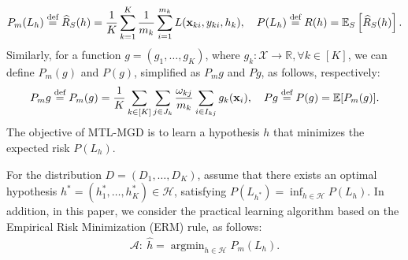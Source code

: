 \documentclass{article}
\def\sR{\mathbb{R}}
\def\vx{{\mathbf{x}}}
\def\mX{{\mathbf{X}}}
\def\eE{\mathbb{E}}
\def\tS{\tilde{S}}
\def\ty{\tilde{y}}
\def\defeq{\overset{\textup{def}}{=}}
\DeclareMathOperator*{\argmin}{argmin}
\begin{document}
    \begin{align} \label{def: initial risk}
        P_m (L_h) \defeq \widehat{R}_{S}(h) = \frac{1}{K} \sum_{k=1}^K \frac{1}{m_k} \sum_{i=1}^{m_k} L(\vx_{ki}, y_{ki}, h_k) , \quad  P (L_h) \defeq R(h) = \eE_{S} \left[ \widehat{R}_{S}(h) \right] .
    \end{align}
Similarly, for a function $g = (g_1,\dots, g_K)$, where $g_k: \mathcal{X} \rightarrow \sR, \forall k \in [K]$, 
we can define $P_m (g)$ and $P (g)$, simplified as $P_m g$ and $P g$, as follows, respectively:
\begin{align} \label{def: pmg} 
    P_m g \defeq P_m (g)  = \frac{1}{K} \sum_{k \in [K]} \sum_{j \in J_k} \frac{\omega_{kj}}{m_k} \sum_{i \in I_{kj}} g_k(\vx_i), \quad 
    P g \defeq P (g)  = \eE [P_m (g)]. 
\end{align}
The objective of MTL-MGD is to learn a hypothesis $h$ that minimizes the expected risk $P (L_h)$. 

For the distribution $D = (D_1, \dots, D_K)$, assume that there exists an optimal hypothesis $h^*=(h_1^*,\dots,h_K^*) \in \mathcal{H}$, satisfying $P (L_{h^*}) = \inf_{h \in \mathcal{H}} P (L_h)$.
In addition, in this paper, we consider the practical learning algorithm based on the Empirical Risk Minimization (ERM) rule, as follows:
\begin{align}
    \mathcal{A}: \ \hat{h} = \argmin_{h \in \mathcal{H}} P_m(L_h) .
\end{align}

\end{document}
